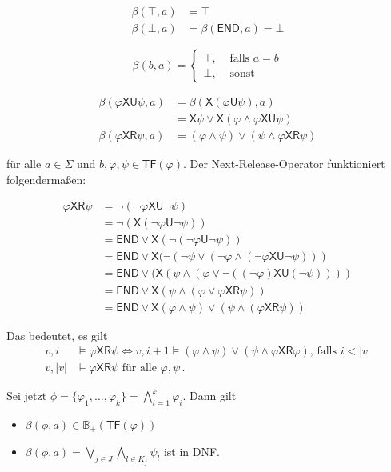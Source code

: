 \documentclass[12pt, german]{article}
\newcommand{\B}{\mathbb{B}}
\newcommand{\sX}{\mathsf{X}}
\newcommand{\sU}{\mathsf{U}}
\newcommand{\sR}{\mathsf{R}}
\newcommand{\sende}{\mathsf{END}}
\newcommand{\tf}{\mathsf{TF}}
\begin{document}
	\begin{align*}
		 \beta(\top, a) &= \top\\
		 \beta(\bot, a) &= \beta(\sende, a) = \bot
	\end{align*}

	\[\beta(b, a) =  
		\begin{cases}
			\top, & \text{ falls } a = b \\
			\bot, & \text{ sonst}
		\end{cases}	
		\]
		
	\begin{align*}
		\beta(\varphi \sX\sU\psi, a) &= \beta(\sX(\varphi \sU \psi), a) \\
		&= \sX \psi \lor \sX(\varphi \land \varphi \sX\sU \psi)\\
		\beta(\varphi\sX\sR\psi, a) &= (\varphi \land \psi) \lor (\psi \land \varphi \sX\sR \psi)
	\end{align*}

	für alle $a \in \Sigma$ und $b, \varphi, \psi \in \tf(\varphi)$. 
	Der Next-Release-Operator funktioniert folgenderma\ss en:

	\begin{align*}
		\varphi \sX\sR\psi &= \neg(\neg\varphi \sX\sU \neg \psi) \\
		&= \neg(\sX(\neg\varphi \sU \neg \psi)) \\
		&=\sende \lor \sX(\neg(\neg \varphi \sU \neg \psi)) \\
		&= \sende \lor \sX(\neg( \neg \psi \lor (\neg \varphi\land (\neg \varphi \sX\sU \neg \psi))) \\
		&= \sende \lor (\sX(\psi \land (\varphi \lor \neg((\neg \varphi)\sX \sU (\neg \psi)))) \\
		&= \sende \lor \sX(\psi \land (\varphi \lor \varphi \sX\sR\psi)) \\
		&=\sende \lor \sX(\varphi\land \psi) \lor (\psi \land (\varphi \sX\sR \psi))
	\end{align*}

	 Das bedeutet, es gilt
	\begin{align*}
		v, i &\models \varphi \sX\sR\psi \iff v, i+1 \models (\varphi \land \psi) \lor (\psi \land \varphi \sX\sR \varphi) \text{, falls } i < |v| \\
		v, |v| &\models \varphi \sX \sR \psi \text{ für alle } \varphi, \psi\, .
	\end{align*} 
	\newline

	Sei jetzt $\phi = \{\varphi_1, \ldots, \varphi_k\} = \bigwedge_{i = 1}^k \varphi_i$.
	Dann gilt 
	\begin{itemize}
		\item$\beta(\phi, a) \in \B_+(\tf(\varphi))$
		\item $\beta(\phi, a) = \bigvee_{j \in J} \bigwedge_{l \in K_j}\psi_l$ ist in DNF.
	\end{itemize}
	
\end{document}
